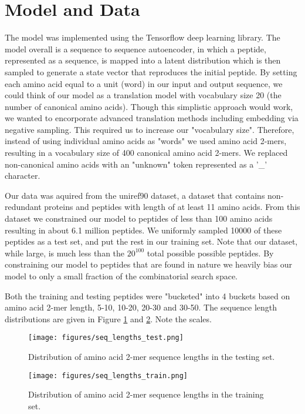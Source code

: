 \documentclass[preprint,12pt]{elsarticle}
\begin{document}
\section{Model and Data}

The model was implemented using the Tensorflow deep learning library\cite{tensorflow2015-whitepaper}. The model overall is a sequence to sequence autoencoder, in which a peptide, represented as a sequence, is mapped into a latent distribution which is then sampled to generate a state vector that reproduces the initial peptide. By setting each amino acid equal to a unit (word) in our input and output sequence, we could think of our model as a translation model with vocabulary size 20 (the number of canonical amino acids). Though this simplistic approach would work, we wanted to encorporate advanced translation methods including embedding via negative sampling. This required us to increase our "vocabulary size". Therefore, instead of using individual amino acids as "words" we used amino acid 2-mers, resulting in a vocabulary size of 400 canonical amino acid 2-mers. We replaced non-canonical amino acids with an "unknown" token represented as a '\_' character.

Our data was aquired from the uniref90 dataset, a dataset that contains non-redundant proteins and peptides with length of at least 11 amino acids. From this dataset we constrained our model to peptides of less than 100 amino acids resulting in about 6.1 million peptides. We uniformly sampled 10000 of these peptides as a test set, and put the rest in our training set. Note that our dataset, while large, is much less than the $20^{100}$ total possible possible peptides. By constraining our model to peptides that are found in nature we heavily bias our model to only a small fraction of the combinatorial search space.

Both the training and testing peptides were "bucketed" into 4 buckets based on amino acid 2-mer length, 5-10, 10-20, 20-30 and 30-50. The sequence length distributions are given in Figure \ref{fig:distribution_data_testing} and \ref{fig:distribution_data_training}. Note the scales.

\begin{figure}
  \centering
  \texttt{[image: figures/seq\_lengths\_test.png]}
  \caption{Distribution of amino acid 2-mer sequence lengths in the testing set.}
  \label{fig:distribution_data_testing}
\end{figure}

\begin{figure}
  \centering
  \texttt{[image: figures/seq\_lengths\_train.png]}
  \caption{Distribution of amino acid 2-mer sequence lengths in the training set.}
  \label{fig:distribution_data_training}
\end{figure}
\end{document}

